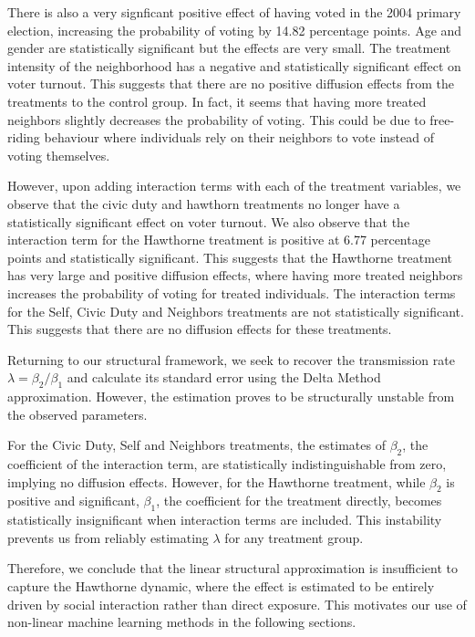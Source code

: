 \documentclass[11pt]{article}
\begin{document}
There is also a very signficant positive effect of having voted in the 2004 primary election, increasing the probability of voting by 14.82 percentage points. Age and gender are statistically significant but the effects are very small. The treatment intensity of the neighborhood has a negative and statistically significant effect on voter turnout. This suggests that there are no positive diffusion effects from the treatments to the control group. In fact, it seems that having more treated neighbors slightly decreases the probability of voting. This could be due to free-riding behaviour where individuals rely on their neighbors to vote instead of voting themselves.

However, upon adding interaction terms with each of the treatment variables, we observe that the civic duty and hawthorn treatments no longer have a statistically significant effect on voter turnout. We also observe that the interaction term for the Hawthorne treatment is positive at 6.77 percentage points and statistically significant. This suggests that the Hawthorne treatment has very large and positive diffusion effects, where having more treated neighbors increases the probability of voting for treated individuals. The interaction terms for the Self, Civic Duty and Neighbors treatments are not statistically significant. This suggests that there are no diffusion effects for these treatments.

Returning to our structural framework, we seek to recover the transmission rate $\lambda = \beta_2 / \beta_1$ and calculate its standard error using the Delta Method approximation. However, the estimation proves to be structurally unstable from the observed parameters.

For the Civic Duty, Self and Neighbors treatments, the estimates of $\beta_2$, the coefficient of the interaction term, are statistically indistinguishable from zero, implying no diffusion effects. However, for the Hawthorne treatment, while $\beta_2$ is positive and significant, $\beta_1$, the coefficient for the treatment directly, becomes statistically insignificant when interaction terms are included. This instability prevents us from reliably estimating $\lambda$ for any treatment group.

Therefore, we conclude that the linear structural approximation is insufficient to capture the Hawthorne dynamic, where the effect is estimated to be entirely driven by social interaction rather than direct exposure. This motivates our use of non-linear machine learning methods in the following sections.
\pagebreak
\end{document}
